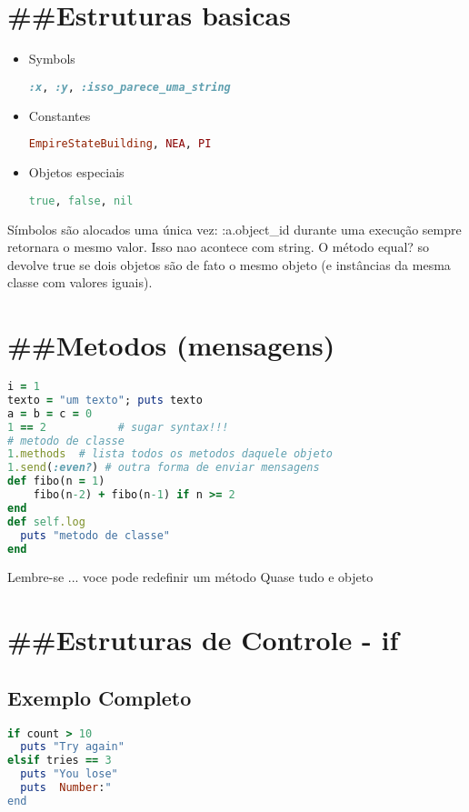\documentclass[serif,mathserif]{article}
\begin{document}
\section{\#\#Estruturas basicas}
\begin{itemize}
  \item Symbols
\begin{lstlisting}[language=ruby]
:x, :y, :isso_parece_uma_string
\end{lstlisting}

  \item Constantes 
\begin{lstlisting}[language=ruby]  
EmpireStateBuilding, NEA, PI
\end{lstlisting}

  \item Objetos especiais 
\begin{lstlisting}[language=ruby]
true, false, nil
\end{lstlisting}
\end{itemize}

Símbolos são alocados uma única vez: :a.object\_id durante uma execução sempre
retornara o mesmo valor. Isso nao acontece com string. O método equal? so
devolve true se dois objetos são de fato o mesmo objeto (e instâncias da mesma
classe com valores iguais).

\section{\#\#Metodos (mensagens)}
\begin{lstlisting}[language=ruby]
i = 1        
texto = "um texto"; puts texto
a = b = c = 0
1 == 2           # sugar syntax!!!
# metodo de classe
1.methods  # lista todos os metodos daquele objeto
1.send(:even?) # outra forma de enviar mensagens
def fibo(n = 1)
    fibo(n-2) + fibo(n-1) if n >= 2
end
def self.log
  puts "metodo de classe"
end
\end{lstlisting}

Lembre-se ... voce pode redefinir um método
Quase tudo e objeto

\section{\#\#Estruturas de Controle - if}
 
       
\subsection {Exemplo Completo}
\begin{lstlisting}[language=ruby]
if count > 10
  puts "Try again"
elsif tries == 3
  puts "You lose"
  puts  Number:"
end
\end{lstlisting}
\end{document}
